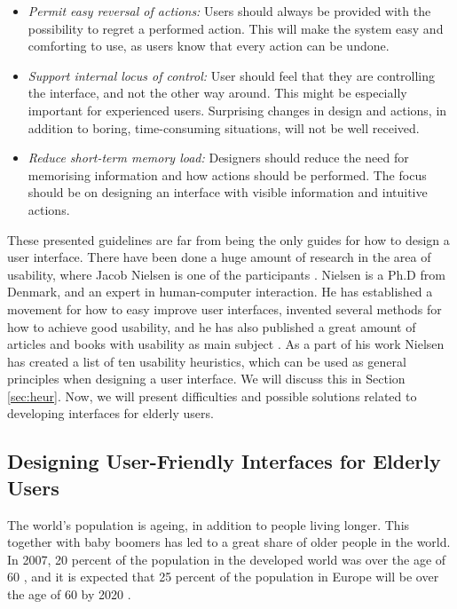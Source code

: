 \begin{itemize}
\item \emph{Permit easy reversal of actions:} Users should always be provided with the possibility to regret a performed action. This will make the system easy and comforting to use, as users know that every action can be undone. 
\item \emph{Support internal locus of control:} User should feel that they are controlling the interface, and not the other way around. This might be especially important for experienced users. Surprising changes in design and actions, in addition to boring, time-consuming situations, will not be well received. 
\item \emph{Reduce short-term memory load:} Designers should reduce the need for memorising information and how actions should be performed. The focus should be on designing an interface with visible information and intuitive actions.
\end{itemize}

These presented guidelines are far from being the only guides for how to design a user interface. There have been done a huge amount of research in the area of usability, where Jacob Nielsen is one of the participants \cite{nielsen2005ten}. Nielsen is a Ph.D from Denmark, and an expert in human-computer interaction. He has established a movement for how to easy improve user interfaces, invented several methods for how to achieve good usability, and he has also published a great amount of articles and books with usability as main subject \cite{JNielsen}. As a part of his work Nielsen has created a list of ten usability heuristics, which can be used as general principles when designing a user interface\cite{nielsen2005ten}. We will discuss this in Section \ref{sec:heur}. Now, we will present difficulties and possible solutions related to developing interfaces for elderly users.

\subsection{Designing User-Friendly Interfaces for Elderly Users}
\label{sec:designelderly}
The world's population is ageing, in addition to people living longer. This together with baby boomers has led to a great share of older people in the world. In 2007, 20 percent of the population in the developed world was over the age of 60 \cite{dickinson2007methods}, and it is expected that 25 percent of the population in Europe will be over the age of 60 by 2020 \cite{ijsselsteijn2007digital}. 

